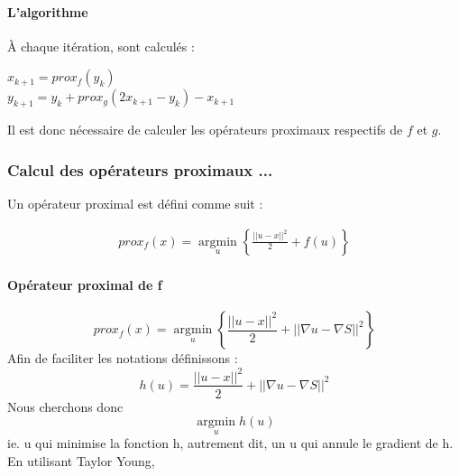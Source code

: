 \paragraph{L'algorithme}
À chaque itération, sont calculés : 
\begin{center}
$x_{k+1} = prox_f(y_k)$\\
$y_{k+1} = y_k+prox_g(2x_{k+1}-y_k)-x_{k+1}$
\end{center}{}
Il est donc nécessaire de calculer les opérateurs proximaux respectifs de $f$ et $g$. 
\subsubsection{Calcul des opérateurs proximaux ...}
Un opérateur proximal est défini comme suit : 
\begin{center}
\begin{equation*}
\begin{aligned}
prox_f(x) = \operatorname*{argmin}_u \left\{ \frac{||u-x||^2}{2}+ f(u)\right\}
\end{aligned}
\end{equation*}
\end{center}
\cite{Opti}
\paragraph{Opérateur proximal de f}
\begin{equation*}
prox_f(x) = \operatorname*{argmin}_u\left\{\frac{||u-x||^2}{2}+||\nabla u -\nabla S ||^2 \right\}
\end{equation*}
Afin de faciliter les notations définissons :
\begin{equation*}
h(u) = \frac{||u-x||^2}{2}+||\nabla u -\nabla S ||^2
\end{equation*} 
Nous cherchons donc 
\begin{equation*}
\operatorname*{argmin}_u h(u)
\end{equation*}
ie. u qui minimise la fonction h, autrement dit, un u qui annule le gradient de h.\\
En utilisant Taylor Young, 

